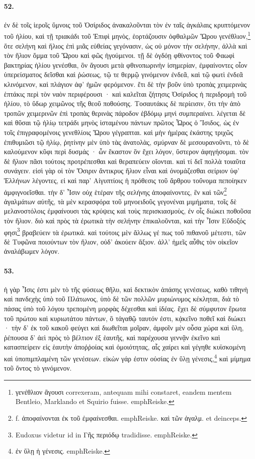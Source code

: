 \documentclass[a4paper, 11pt, oneside, polutonikogreek, german]{article}
\begin{document}
\paragraph{52.}
ἐν δὲ τοῖς ἱεροῖς ὕμνοις τοῦ Ὀσίριδος ἀνακαλοῦνται τὸν ἐν ταῖς ἀγκάλαις κρυπτόμενον τοῦ ἡλίου, καὶ τῇ τριακάδι τοῦ Ἐπιφὶ μηνὸς, ἑορτάζουσιν ὀφθαλμῶν Ὥρου γενέθλιον,\footnote{γενέθλιον ἂγουσι correxeram, antequam mihi constaret, eandem mentem Bentleio, Marklando et Squirio fuisse. emph{Reiske.}} ὅτε σελήνη καὶ ἥλιος ἐπὶ μιᾶς εὐθείας γεγόνασιν, ὡς οὐ μόνον τὴν σελήνην, ἀλλὰ καὶ τὸν ἥλιον ὄμμα τοῦ Ὥρου καὶ φῶς ἡγούμενοι. τῇ δὲ ὀγδόῃ φθίνοντος τοῦ Φαωφὶ βακτηρίας ἡλίου γενέσθαι, ὃν ἄγουσι μετὰ φθινοπωρινὴν ἰσημερίαν, ἐμφαίνοντες οἷον ὑπερείσματος δεῖσθαι καὶ ῥώσεως, τῷ τε θερμῷ γινόμενον ἐνδεᾶ, καὶ τῷ φωτὶ ἐνδεᾶ κλινόμενον, καὶ πλάγιον ἀφ' ἡμῶν φερόμενον. ἔτι δὲ τὴν βοῦν ὑπὸ τροπὰς χειμερινὰς ἑπτάκις περὶ τὸν ναὸν περιφέρουσι · καὶ καλεῖται ζήτησις Ὀσίριδος ἡ περιδρομὴ τοῦ ἡλίου, τὸ ὕδωρ χειμῶνος τῆς θεοῦ ποθούσης. Τοσαυτάκις δὲ περίεισιν, ὅτι τὴν ἀπὸ τροπῶν χειμερινῶν ἐπὶ τροπὰς θερινὰς πάροδον ἑβδόμῳ μηνὶ συμπεραίνει. λέγεται δὲ καὶ θῦσαι τῷ ἡλίῳ τετράδι μηνὸς ἱσταμένου πάντων πρῶτος Ὧρος ὁ Ἴσιδος, ὡς ἐν τοῖς ἐπιγραφομένοις γενεθλίοις Ὥρου γέγραπται. καὶ μὴν ἡμέρας ἑκάστης τριχῶς ἐπιθυμιῶσι τῷ ἡλίῳ, ῥητίνην μὲν ὑπὸ τὰς ἀνατολὰς, σμύρναν δὲ μεσουρανοῦντι, τὸ δὲ καλούμενον κῦφι περὶ δυσμάς · ὧν ἕκαστον ὃν ἔχει λόγον, ὕστερον ἀφηγήσομαι. τὸν δὲ ἥλιον πᾶσι τούτοις προτρέπεσθαι καὶ θεραπεύειν οἴονται. καὶ τί δεῖ πολλὰ τοιαῦτα συνάγειν. εἰσὶ γὰρ οἱ τὸν Ὄσιριν ἄντικρυς ἥλιον εἶναι καὶ ὀνομάζεσθαι σείριον ὑφ' Ἑλλήνων λέγοντες, εἰ καὶ παρ' Αἰγυπτίοις ἡ πρόθεσις τοῦ ἄρθρου τοὔνομα πεποίηκεν ἀμφιγνοεῖσθαι. τὴν δ' Ἶσιν οὐχ ἑτέραν τῆς σελήνης ἀποφαίνοντες, ἓν καὶ τῶν\footnote{f. ἀποφαίνονται ἐκ τοῦ ἐμφαίνεσθαι. emph{Reiske.} καὶ τῶν ἀγαλμ. et deinceps.} ἀγαλμάτων αὐτῆς, τὰ μὲν κερασφόρα τοῦ μηνοειδοῦς γεγονέναι μιμήματα, τοῖς δὲ μελανοστόλοις ἐμφαίνουσι τὰς κρύψεις καὶ τοὺς περισκιασμοὺς, ἐν οἷς διώκει ποθοῦσα τὸν ἥλιον. διὸ καὶ πρὸς τὰ ἐρωτικὰ τὴν σελήνην ἐπικαλοῦνται, καὶ τὴν Ἶσιν Εὔδοξός φησι\footnote{Eudoxus videtur id in Γῆς περιόδῳ tradidisse. emph{Reiske.}} βραβεύειν τὰ ἐρωτικά. καὶ τούτοις μὲν ἄλλως γέ πως τοῦ πιθανοῦ μέτεστι, τῶν δὲ Τυφῶνα ποιούντων τὸν ἥλιον, οὐδ' ἀκούειν ἄξιον. ἀλλ' ἡμεῖς αὖθις τὸν οἰκεῖον ἀναλάβωμεν λόγον.

\paragraph{53.}
ἡ γὰρ Ἶσις ἐστι μὲν τὸ τῆς φύσεως θῆλυ, καὶ δεκτικὸν ἁπάσης γενέσεως, καθὸ τιθηνὴ καὶ πανδεχὴς ὑπὸ τοῦ Πλάτωνος, ὑπὸ δὲ τῶν πολλῶν μυριώνυμος κέκληται, διὰ τὸ πάσας ὑπὸ τοῦ λόγου τρεπομένη μορφὰς δέχεσθαι καὶ ἰδέας. ἔχει δὲ σύμφυτον ἔρωτα τοῦ πρώτου καὶ κυριωτάτου πάντων, ὃ τἀγαθῷ ταυτόν ἐστι, κᾀκεῖνο ποθεῖ καὶ διώκει · τὴν δ' ἐκ τοῦ κακοῦ φεύγει καὶ διωθεῖται μοῖραν, ἀμφοῖν μὲν οὖσα χώρα καὶ ὕλη, ῥέπουσα δ' ἀεὶ πρὸς τὸ βέλτιον ἐξ ἑαυτῆς, καὶ παρέχουσα γεννᾷν ἐκεῖνο καὶ κατασπείρειν εἰς ἑαυτὴν ἀποῤῥοίας καὶ ὁμοιότητας, αἷς χαίρει καὶ γέγηθε κυϊσκομένη καὶ ὑποπιμπλαμένη τῶν γενέσεων. εἰκὼν γάρ ἐστιν οὐσίας ἐν ὕλῃ γένεσις,\footnote{ἐν ὕλῃ ἡ γένεσις. emph{Reiske.}} καὶ μίμημα τοῦ ὄντος τὸ γινόμενον.
\end{document}
